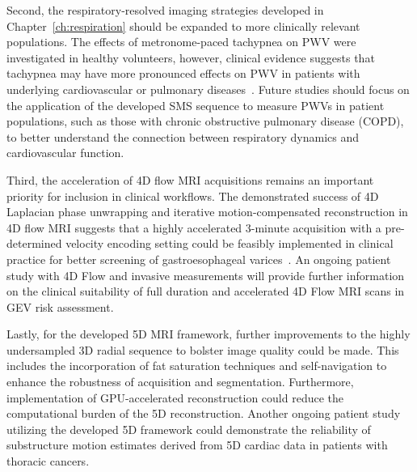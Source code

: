 Second, the respiratory-resolved imaging strategies developed in Chapter~\ref{ch:respiration} should be expanded to more clinically relevant populations. The effects of metronome-paced tachypnea on PWV were investigated in healthy volunteers, however, clinical evidence suggests that tachypnea may have more pronounced effects on PWV in patients with underlying cardiovascular or pulmonary diseases~\cite{tzaniDynamicHyperinflationAssociated2011}. Future studies should focus on the application of the developed SMS sequence to measure PWVs in patient populations, such as those with chronic obstructive pulmonary disease (COPD), to better understand the connection between respiratory dynamics and cardiovascular function. 

Third, the acceleration of 4D flow MRI acquisitions remains an important priority for inclusion in clinical workflows. The demonstrated success of 4D Laplacian phase unwrapping and iterative motion-compensated reconstruction in 4D flow MRI suggests that a highly accelerated 3-minute acquisition with a pre-determined velocity encoding setting could be feasibly implemented in clinical practice for better screening of gastroesophageal varices~\cite{loecherPhaseUnwrapping4D2016,zhuIterativeMotioncompensationReconstruction2020}. An ongoing patient study with 4D Flow and invasive measurements will provide further information on the clinical suitability of full duration and accelerated 4D Flow MRI scans in GEV risk assessment.

Lastly, for the developed 5D MRI framework, further improvements to the highly undersampled 3D radial sequence to bolster image quality could be made. This includes the incorporation of fat saturation techniques and self-navigation to enhance the robustness of acquisition and segmentation. Furthermore, implementation of GPU-accelerated reconstruction could reduce the computational burden of the 5D reconstruction. Another ongoing patient study utilizing the developed 5D framework could demonstrate the reliability of substructure motion estimates derived from 5D cardiac data in patients with thoracic cancers.



